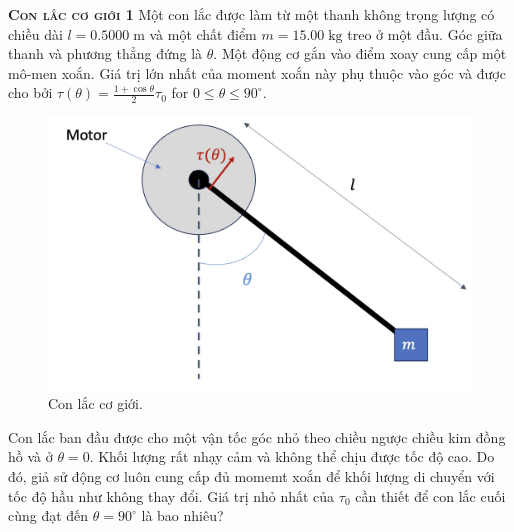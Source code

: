 \begin{problem}
\textbf{\textsc{Con lắc cơ giới 1}}
Một con lắc được làm từ một thanh không trọng lượng có chiều dài $l=0.5000\;\mathrm{m}$ và một chất điểm $m=15.00\;\mathrm{kg}$ treo ở một đầu. Góc giữa thanh và phương thẳng đứng là $\theta$. Một động cơ gắn vào điểm xoay cung cấp một mô-men xoắn. Giá trị lớn nhất của moment xoắn này phụ thuộc vào góc và được cho bởi $\tau (\theta)=\frac{1+\cos\theta}{2} \tau_0$ for $0\leq \theta \leq 90^{\circ}$.

\begin{figure}[h]
    \centering
    \includegraphics[width=0.5\linewidth]{problems/figures/mot_pend.png}
    \caption{Con lắc cơ giới.}
    \label{fig:enter-label}
\end{figure}

Con lắc ban đầu được cho một vận tốc góc nhỏ theo chiều ngược chiều kim đồng hồ và ở $\theta = 0$. Khối lượng rất nhạy cảm và không thể chịu được tốc độ cao. Do đó, giả sử động cơ luôn cung cấp đủ momemt xoắn để khối lượng di chuyển với tốc độ hầu như không thay đổi. Giá trị nhỏ nhất của $\tau_0$ cần thiết để con lắc cuối cùng đạt đến $\theta=90^{\circ}$ là bao nhiêu?


\end{problem}
